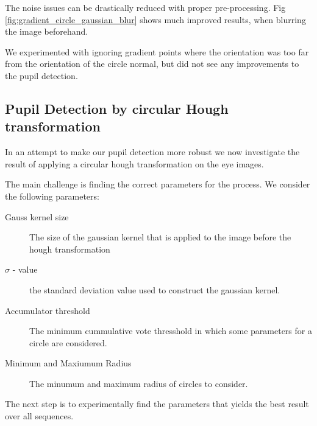 \documentclass[a4paper,11pt]{article}
\begin{document}
The noise issues can be drastically reduced with proper pre-processing. Fig \ref{fig:gradient_circle_gaussian_blur} shows much improved results, when blurring the image beforehand.

We experimented with ignoring gradient points where the orientation was too far from the orientation of the circle normal, but did not see any improvements to the pupil detection.

\subsection{Pupil Detection by circular Hough transformation}

In an attempt to make our pupil detection more robust we now investigate the result of applying a
circular hough transformation on the eye images.

The main challenge is finding the correct parameters for the process. We consider the following parameters:

\begin{description}
  \item[Gauss kernel size] The size of the gaussian kernel that is applied to the image before the hough transformation

  \item[$\sigma$ - value] the standard deviation value used to construct the gaussian kernel.

  \item[Accumulator threshold] The minimum cummulative vote thresshold in which some parameters for a circle are considered.

  \item[Minimum and Maxiumum Radius] The minumum and maximum radius of circles to consider.

\end{description}

The next step is to experimentally find the parameters that yields the best result over all sequences.
\end{document}
